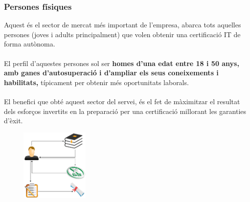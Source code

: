 \documentclass[12pt]{article}
\begin{document}
\subsubsection{Persones físiques}
Aquest és el sector de mercat més important de l'empresa, abarca tots aquelles persones (joves i adults principalment) que volen obtenir una certificació IT de forma autònoma.
\\\\El perfil d'aquestes persones sol ser \textbf{homes d'una edat entre 18 i 50 anys, amb ganes d'autosuperació i d'ampliar els seus coneixements i habilitats,} típicament per obtenir més oportunitats laborals.
\\\\El benefici que obté aquest sector del servei, és el fet de màximitzar el resultat dels esforços invertits en la preparació per una certificació millorant les garanties d'èxit.
\begin{figure}[h!]
	\centering
	\includegraphics[width=0.3\textwidth]{imatges/personaFisica.png}
\end{figure}
\end{document}
